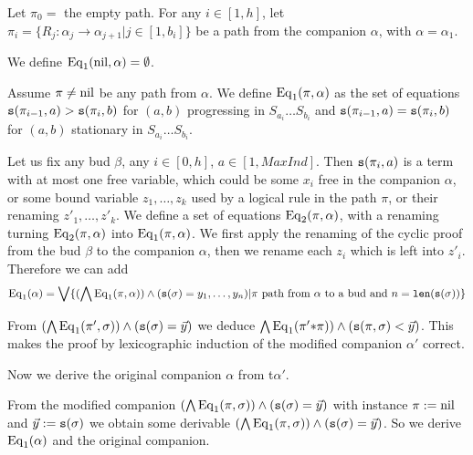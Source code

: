 \documentclass{lmcs}
\begin{document}
Let $\pi_0=$ the empty path. For any $i \in [1,h]$, let 
$\pi_i = \{R_j:\alpha_j \rightarrow \alpha_{j+1} | j \in [1,b_i]\}$ be a path from
the companion $\alpha$, with $\alpha = \alpha_1$.

We define ${\rm Eq}_1({{\rm nil}},\alpha) = \emptyset$.

Assume $\pi \not = {{\rm nil}}$ be any path from $\alpha$.
We define ${\rm Eq}_1(\pi, \alpha)$ as the set of equations 
${\tt s}(\pi_{i-1},a) > {\tt s}(\pi_i,b)$ for $(a,b)$ progressing
in $S_{a_i}\ldots S_{b_i}$ and 
${\tt s}(\pi_{i-1},a) = {\tt s}(\pi_i,b)$ for $(a,b)$ stationary
in $S_{a_i}\ldots S_{b_i}$. 

Let us fix any bud $\beta$,  any $i \in [0,h]$, $a \in [1,MaxInd]$.
Then ${\tt s}(\pi_i,a)$ is a term with at most one free variable, which could be some 
$x_i$ free in the companion $\alpha$, or some bound variable $z_1, \ldots, z_k$
used by a logical rule in the path $\pi$, or their renaming $z'_1, \ldots, z'_k$.
We define a set of equations ${\rm Eq}_2(\pi,\alpha)$, with a renaming turning 
${\rm Eq}_2(\pi,\alpha)$ into ${\rm Eq}_1(\pi,\alpha)$. We first apply the renaming of the cyclic 
proof from the bud $\beta$ to the companion $\alpha$, then we rename each $z_i$
which is left into $z'_i$. Therefore we can add 
$$
{\rm Eq}_1(\alpha)
 =
\bigvee 
\{ 
(\bigwedge {\rm Eq}_1(\pi,\alpha)) \wedge  ({\tt s}(\sigma) = y_1, \ldots, y_n) | 
\pi \mbox{ path from $\alpha$ to a bud and $n = {\mbox{\tt len}}({\tt s}(\sigma))$}
\}
$$

From 
$(\bigwedge {\rm Eq}_1(\pi',\sigma)) \wedge ({\tt s}(\sigma)=\vec{y})$ 
we deduce 
$\bigwedge {\rm Eq}_1(\pi' {*} \pi)) \wedge  ({\tt s}(\pi,\sigma) < \vec{y})$. This makes the
proof by lexicographic induction of the modified companion $\alpha'$ correct.

Now we derive the original companion $\alpha$ from t$\alpha'$.

From the modified companion $(\bigwedge {\rm Eq}_1(\pi,\sigma)) \wedge ({\tt s}(\sigma)=\vec{y})$
with instance $\pi := {{\rm nil}}$ and $\vec{y} :={\tt s}(\sigma)$ we obtain 
some derivable  $(\bigwedge {\rm Eq}_1(\pi,\sigma)) \wedge ({\tt s}(\sigma)=\vec{y})$.
So we derive ${\rm Eq}_1(\alpha)$ and the original companion.

%
%





 

 
\end{document}
